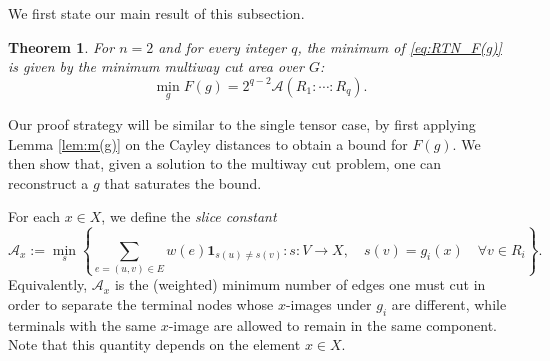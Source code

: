 \documentclass[11pt,oneside,letterpaper]{article}
\numberwithin{equation}{section}
\newtheorem{theorem}{Theorem}
\theoremstyle{definition}
\theoremstyle{remark}
\begin{document}
We first state our main result of this subsection.
\begin{theorem}
  \label{thm:RTN}
  For $n=2$ and for every integer $q$, the minimum of \eqref{eq:RTN_F(g)} is given by the minimum multiway cut area over $G$:
  \begin{equation}
    \min_g F(g) = 2^{q-2}\mathcal{A}(R_1:\cdots :R_q).
  \end{equation}
\end{theorem}
Our proof strategy will be similar to the single tensor case, by first applying Lemma \ref{lem:m(g)} on the Cayley distances to obtain a bound for $F(g)$. We then show that, given a solution to the multiway cut problem, one can reconstruct a $g$ that saturates the bound.

For each $x\in X$, we define the \emph{slice constant}
\begin{equation}
  \mathcal{A}_x := \min_s\left\{ \sum_{e=(u,v)\in E} w(e) \mathbf{1}_{s(u)\ne s(v)}: s:V\to X, \quad s(v)=g_i(x)\quad  \forall v\in R_i \right\} .
\end{equation}
Equivalently, $\mathcal{A}_x$ is the (weighted) minimum number of edges one must cut in order to separate the terminal nodes whose $x$-images under $g_i$ are different, while terminals with the same $x$-image are allowed to remain in the same component. Note that this quantity depends on the element $x\in X$.
\end{document}
